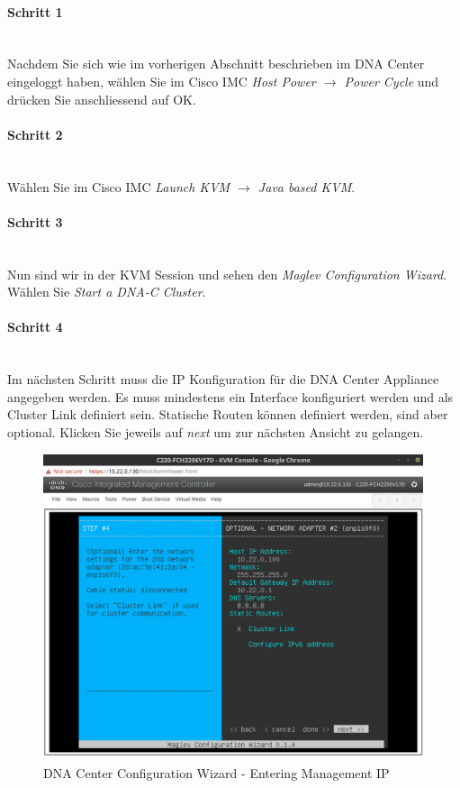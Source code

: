 \paragraph{Schritt 1}
~\\
Nachdem Sie sich wie im vorherigen Abschnitt beschrieben im DNA Center eingeloggt haben, wählen Sie im Cisco IMC \textit{Host Power $\rightarrow$ Power Cycle} und drücken Sie anschliessend auf OK. 

\paragraph{Schritt 2}
~\\
Wählen Sie im Cisco IMC \textit{Launch KVM $\rightarrow$ Java based KVM}.

\paragraph{Schritt 3}
~\\
Nun sind wir in der KVM Session und sehen den \textit{Maglev Configuration Wizard}. Wählen Sie \textit{Start a DNA-C Cluster}.

\paragraph{Schritt 4}
~\\
Im nächsten Schritt muss die IP Konfiguration für die DNA Center Appliance angegeben werden. Es muss mindestens ein Interface konfiguriert werden und als Cluster Link definiert sein. Statische Routen können definiert werden, sind aber optional. Klicken Sie jeweils auf \textit{next} um zur nächsten Ansicht zu gelangen.

\begin{figure}[H]
	\centering
	\includegraphics[height=9cm]{img/sc_002.png}
	\caption{DNA Center Configuration Wizard - Entering Management IP}
	\label{fig:installguide-dna-center-install-step-4}
\end{figure} 

